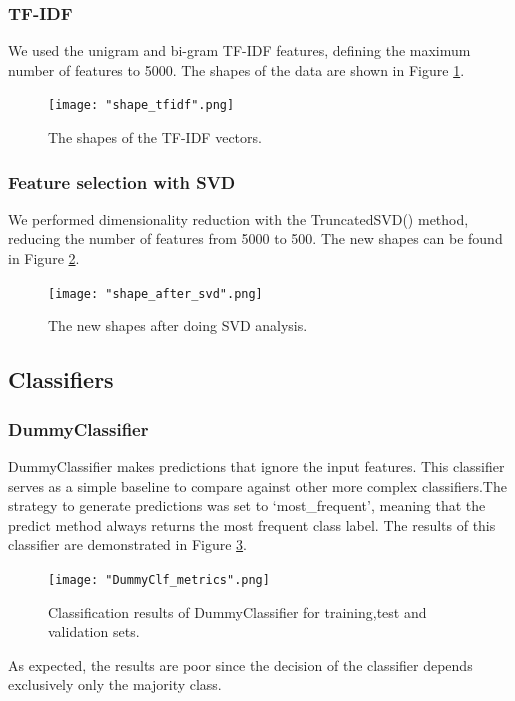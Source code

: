 \documentclass[10pt, a4paper]{article}
\begin{document}
    \subsubsection{TF-IDF}
    We used the unigram and bi-gram TF-IDF features, defining the maximum number of features to 5000. The shapes of the data are shown in Figure \ref{fig::tf_idf}.

    \begin{figure}
	    \centering
            \texttt{[image: "shape\_tfidf".png]}
	    \caption{The shapes of the TF-IDF vectors.}
	    \label{fig::tf_idf}
    \end{figure}

    \subsubsection{Feature selection with SVD}
    We performed dimensionality reduction with the TruncatedSVD() method, reducing the number of features from 5000 to 500. The new shapes can be found in Figure \ref{fig::svd}.

    \begin{figure}
	    \centering
            \texttt{[image: "shape\_after\_svd".png]}
	    \caption{The new shapes after doing SVD analysis.}
	    \label{fig::svd}
    \end{figure}

    \subsection{Classifiers}
    \subsubsection{DummyClassifier}
    DummyClassifier makes predictions that ignore the input features. This classifier serves as a simple baseline to compare against other more complex classifiers.The strategy to generate predictions was set to ‘most\_frequent’,  meaning that the predict method always returns the most frequent class label. The results of this classifier are demonstrated in Figure \ref{fig::dummy_metrics}.

    \begin{figure}
	    \centering
            \texttt{[image: "DummyClf\_metrics".png]}
	    \caption{Classification results of DummyClassifier for training,test and validation sets.}
	    \label{fig::dummy_metrics}
    \end{figure}


    As expected, the results are poor since the decision of the classifier depends exclusively only the majority class.
\end{document}
